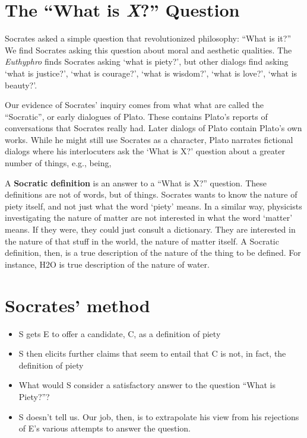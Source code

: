 \documentclass[11pt]{article}
\begin{document}

%

\section*{The ``What is \emph{X}?'' Question}

Socrates asked a simple question that revolutionized philosophy: ``What is it?'' We find Socrates asking this question about moral and aesthetic qualities. The \emph{Euthyphro} finds Socrates asking `what is piety?', but other dialogs find asking `what is justice?', `what is courage?', `what is wisdom?', `what is love?', `what is beauty?'. 

Our evidence of Socrates' inquiry comes from what what are called the  ``Socratic'', or early dialogues of Plato. These contains Plato's reports of conversations that Socrates really had. Later dialogs of Plato contain Plato's own works. While he might still use Socrates as a character, Plato narrates fictional dialogs where his interlocuters ask the `What is X?' question about a greater number of things, e.g., being, 

A \textbf{Socratic definition} is an answer to a ``What is X?'' question. These definitions are not of words, but of things. Socrates wants to know the nature of piety itself, and not just what the word `piety' means. In a similar way, physicists investigating the nature of matter are not interested in what the word `matter' means. If they were, they could just consult a dictionary. They are interested in the nature of that stuff in the world, the nature of matter itself.  A Socratic definition, then, is a true description of the nature of the thing to be defined. For instance, H2O is true description of the nature of water. 


\section*{Socrates' method}

\begin{itemize}
\item S gets E to offer a candidate, C, as a definition of piety
\item S then elicits further claims that seem to entail that C is not, in fact, the definition of piety
\item What would S consider a satisfactory answer to the question ``What is Piety?''?
\item S doesn't tell us. Our job, then, is to extrapolate his view from his rejections of E's various attempts to answer the question.
\end{itemize}
\end{document}
